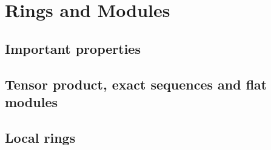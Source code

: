 \section{Rings and Modules}
\subsection{Important properties}
\subsection{Tensor product, exact sequences and flat modules}
\subsection{Local rings}